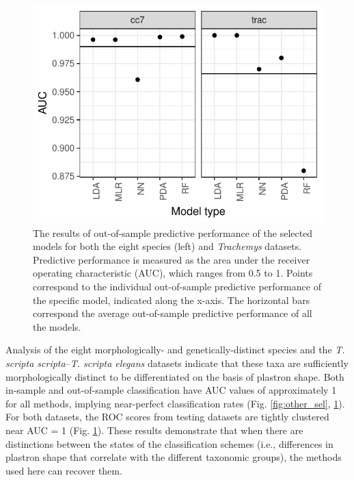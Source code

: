 \documentclass[fleqn,10pt,lineno]{wlpeerj} %
\begin{document}
\begin{figure}[h]
  \centering
  \includegraphics[height = 0.3\textheight, width = \textwidth, keepaspectratio = true]{figure/other_oos_sel}
  \caption{The results of out-of-sample predictive performance of the selected models for both the eight species (left) and \textit{Trachemys} datasets. Predictive performance is measured as the area under the receiver operating characteristic (AUC), which ranges from 0.5 to 1. Points correspond to the individual out-of-sample predictive performance of the specific model, indicated along the x-axis. The horizontal bars correspond the average out-of-sample predictive performance of all the models.}
  \label{fig:other_oos}
\end{figure}

Analysis of the eight morphologically- and genetically-distinct species and the \textit{T. scripta scripta}--\textit{T. scripta elegans} datasets indicate that these taxa are sufficiently morphologically distinct to be differentiated on the basis of plastron shape. Both in-sample and out-of-sample classification have AUC values of approximately 1 for all methods, implying near-perfect classification rates (Fig. \ref{fig:other_sel}, \ref{fig:other_oos}). For both datasets, the ROC scores from testing datasets are tightly clustered near AUC = 1 (Fig. \ref{fig:other_oos}). These results demonstrate that when there are distinctions between the states of the classification schemes (i.e., differences in plastron shape that correlate with the different taxonomic groups), the methods used here can recover them.
\end{document}
